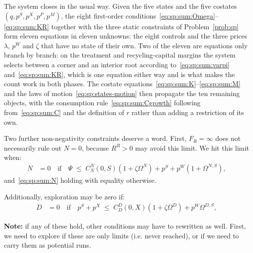 The system closes in the usual way. Given the five states and the five costates $\left(q,p^S,p^X,p^P,p^M\right)$, the eight first-order conditions~\eqref{eq:sp:sum:Omega}--\eqref{eq:sp:sum:KR} together with the three static constraints of Problem~\ref{prob:sp} form eleven equations in eleven unknowns: the eight controls and the three prices $\lambda$, $p^W$ and $\zeta$ that have no state of their own. Two of the eleven are equations only branch by branch: on the treatment and recycling-capital margins the system selects between a corner and an interior root according to~\eqref{eq:sp:sum:varpi} and~\eqref{eq:sp:sum:KR}, which is one equation either way and is what makes the count work in both phases. The costate equations~\eqref{eq:sp:sum:K}--\eqref{eq:sp:sum:M} and the laws of motion~\eqref{eq:sp:states-motion} then propagate the ten remaining objects, with the consumption rule~\eqref{eq:sp:sum:Cgrowth} following from~\eqref{eq:sp:sum:C} and the definition of $r$ rather than adding a restriction of its own.

 Two further non-negativity constraints deserve a word. First, $F_R = \infty$ does not necessarily rule out $N=0$, because $R^R>0$ may avoid this limit. We hit this limit when:
\begin{align}
N &= 0
\quad\text{if}\quad
\Psi \;\le\; C^N_N\left(0,S\right)\left(1+\zeta\Omega^N\right)+p^S+p^W\left(1+\Omega^{N,S}\right),
\label{eq:sp:sum:N-corner}
\end{align}
and~\eqref{eq:sp:sum:N} holding with equality otherwise.


Additionally, exploration may be zero if:
\begin{align}
D &= 0
\quad\text{if}\quad
p^S+p^X \;\le\; C^D_D\left(0,X\right)\left(1+\zeta\Omega^D\right)+p^W\Omega^{D,S},
\label{eq:sp:sum:D-corner}
\end{align}


\textbf{Note:} if any of these hold, other conditions may have to rewritten as well. First, we need to explore if these are only limits (i.e. never reached), or if we need to carry them as potential runs.
